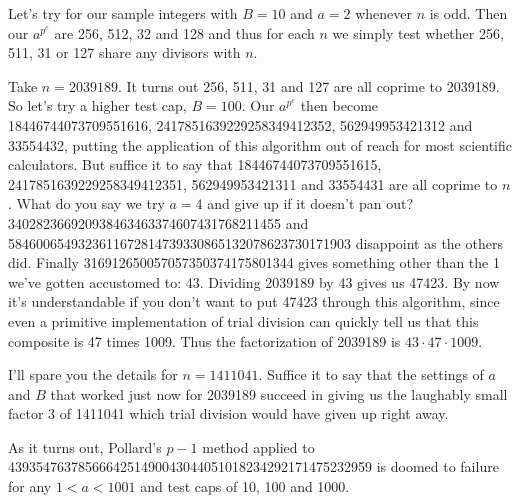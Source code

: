\documentclass[12pt]{article}
\begin{document}
Let's try  for our sample integers with $B = 10$ and $a = 2$ whenever $n$ is odd. Then our $a^{p^e}$ are 256, 512, 32 and 128 and thus for each $n$ we simply test whether 256, 511, 31 or 127 share any divisors with $n$.

Take $n = 2039189$. It turns out 256, 511, 31 and 127 are all coprime to 2039189. So let's try a higher test cap, $B = 100$. Our $a^{p^e}$ then become 18446744073709551616, 2417851639229258349412352, 562949953421312 and 33554432, putting the application of this algorithm out of reach for most scientific calculators. But suffice it to say that 18446744073709551615, 2417851639229258349412351, 562949953421311 and 33554431 are all coprime to $n$. What do you say we try $a = 4$ and give up if it doesn't pan out? 340282366920938463463374607431768211455 and 5846006549323611672814739330865132078623730171903 disappoint as the others did. Finally 316912650057057350374175801344 gives something other than the 1 we've gotten accustomed to: 43. Dividing 2039189 by 43 gives us 47423. By now it's understandable if you don't want to put 47423 through this algorithm, since even a primitive implementation of trial division can quickly tell us that this composite is 47 times 1009. Thus the factorization of 2039189 is $43 \cdot 47 \cdot 1009$.

I'll spare you the details for $n = 1411041$. Suffice it to say that the settings of $a$ and $B$ that worked just now for 2039189 succeed in giving us the laughably small factor 3 of 1411041 which trial division would have given up right away.

As it turns out, Pollard's $p - 1$ method applied to 4393547637856664251490043044051018234292171475232959 is doomed to failure for any $1 < a < 1001$ and test caps of 10, 100 and 1000.
\end{document}
